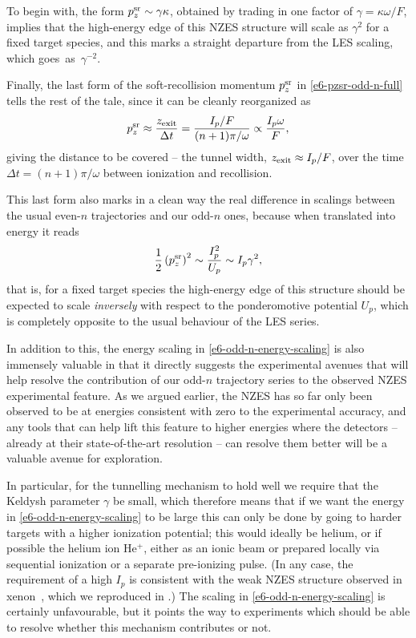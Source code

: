\begin{itemize}
To begin with, the form $p_z^{\mathrm{sr}}\sim \gamma \kappa$, obtained by trading in one factor of $\gamma=\kappa\omega/F$, implies that the high-energy edge of this NZES structure will scale as $\gamma^2$ for a fixed target species, and this marks a straight departure from the LES scaling, which goes~as~$\gamma^{-2}$.

Finally, the last form of the soft-recollision momentum $p_z^{\mathrm{sr}}$ in \eqref{e6-pzsr-odd-n-full} tells the rest of the tale, since it can be cleanly reorganized as 
\begin{equation}
p_z^{\mathrm{sr}} 
\approx \frac{z_\mathrm{exit}}{\Delta t}
= \frac{I_p/F}{(n+1)\pi/\omega}
\propto \frac{I_p\omega}{F},
\label{e6-pzsr-odd-n-summary}
\end{equation}
giving the distance to be covered -- the tunnel width, $z_\mathrm{exit}\approx I_p/F$, over the time $\Delta t=(n+1)\pi/\omega$ between ionization and recollision.

\end{itemize}


This last form also marks in a clean way the real difference in scalings between the usual even-$n$ trajectories and our odd-$n$ ones, because when translated into energy it reads
\begin{equation}
\frac12\left(p_z^{\mathrm{sr}}\right)^2 
\sim \frac{I_p^2}{U_p}
\sim I_p\gamma^2,
\label{e6-odd-n-energy-scaling}
\end{equation}
that is, for a fixed target species the high-energy edge of this structure should be expected to scale \textit{inversely} with respect to the ponderomotive potential $U_p$, which is completely opposite to the usual behaviour of the LES series.

In addition to this, the energy scaling in \eqref{e6-odd-n-energy-scaling} is also immensely valuable in that it directly suggests the experimental avenues that will help resolve the contribution of our odd-$n$ trajectory series to the observed NZES experimental feature. As we argued earlier, the NZES has so far only been observed to be at energies consistent with zero to the experimental accuracy, and any tools that can help lift this feature to higher energies where the detectors -- already at their state-of-the-art resolution -- can resolve them better will be a valuable avenue for exploration. 



In particular, for the tunnelling mechanism to hold well we require that the Keldysh parameter $\gamma$ be small, which therefore means that if we want the energy in \eqref{e6-odd-n-energy-scaling} to be large this can only be done by going to harder targets with a higher ionization potential; this would ideally be helium, or if possible the helium ion $\mathrm{He^+}$, either as an ionic beam or prepared locally via sequential ionization or a separate pre-ionizing pulse. (In any case, the requirement of a high $I_p$ is consistent with the weak NZES structure observed in xenon~\cite{Wolter_PRX}, which we reproduced in .) The scaling in \eqref{e6-odd-n-energy-scaling} is certainly unfavourable, but it points the way to experiments which should be able to resolve whether this mechanism contributes or not. 




